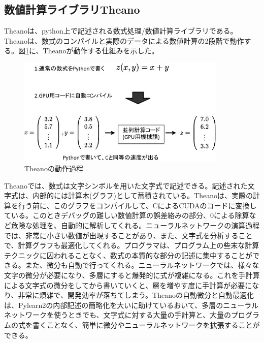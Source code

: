 \subsection{数値計算ライブラリTheano}
Theanoは、python上で記述される数式処理/数値計算ライブラリである。Theanoは、数式のコンパイルと実際のデータによる数値計算の2段階で動作する\cite{bergstra+al:2010-Scipy}。図\ref{c4_Theano_compile}に、Theanoが動作する仕組みを示した。
\begin{figure}[tbp]
 \centering
  \includegraphics[width=100mm]{img/c4/Theano_compile}
 \caption{Theanoの動作過程}
 \label{c4_Theano_compile}
\end{figure}
Theanoでは、数式は文字シンボルを用いた文字式で記述できる。記述された文字式は、内部的には計算木(グラフ)として蓄積されている。Theanoは、実際の計算を行う前に、このグラフをコンパイルして、CによるCUDAのコードに変換している。このときデバッグの難しい数値計算の誤差絡みの部分、0による除算など危険な処理を、自動的に解析してくれる。ニューラルネットワークの演算過程では、非常に小さい数値が出現することがあり、また、文字式を分析することで、計算グラフも最適化してくれる。プログラマは、プログラム上の些末な計算テクニックに囚われることなく、数式の本質的な部分の記述に集中することができる。また、微分も自動で行ってくれる。ニューラルネットワークでは、様々な文字の微分が必要になり、多層にすると爆発的に式が複雑になる。これを手計算による文字式の微分をしてから書いていくと、層を増やす度に手計算が必要になり、非常に煩雑で、開発効率が落ちてしまう。Theanoの自動微分と自動最適化は、Pylearn2の内部記述の簡略化を大いに助けているおいて、多層のニューラルネットワークを使うときでも、文字式に対する大量の手計算と、大量のプログラムの式を書くことなく、簡単に微分やニューラルネットワークを拡張することができる。
